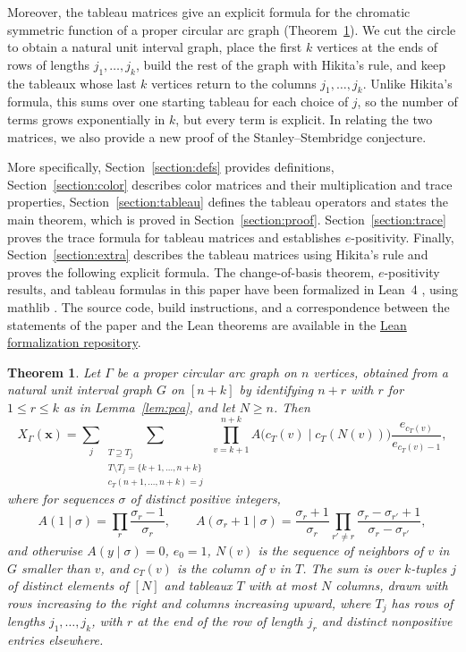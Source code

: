 \documentclass[12pt]{article}
\theoremstyle{plain}
\newtheorem{theorem}{Theorem}
\theoremstyle{definition}
\theoremstyle{remark}
\begin{document}
Moreover, the tableau matrices give an explicit formula for the chromatic symmetric function of a proper circular arc graph (Theorem~\ref{thm:pca-formula}). We cut the circle to obtain a natural unit interval graph, place the first $k$ vertices at the ends of rows of lengths $j_1,\dots,j_k$, build the rest of the graph with Hikita's rule, and keep the tableaux whose last $k$ vertices return to the columns $j_1,\dots,j_k$. Unlike Hikita's formula, this sums over one starting tableau for each choice of $j$, so the number of terms grows exponentially in $k$, but every term is explicit. In relating the two matrices, we also provide a new proof
of the Stanley--Stembridge conjecture.

More specifically, Section~\ref{section:defs} provides definitions, Section~\ref{section:color} describes color matrices and their multiplication and trace properties, Section~\ref{section:tableau}
defines the tableau operators and states the main theorem, which is proved in Section~\ref{section:proof}. Section~\ref{section:trace} proves
the trace formula for tableau matrices and establishes $e$-positivity. Finally, Section~\ref{section:extra} describes the tableau matrices using Hikita's rule and proves the following explicit formula. The change-of-basis theorem, $e$-positivity results, and tableau formulas in this paper have been formalized in Lean~4 \cite{lean4}, using mathlib \cite{mathlib}. The source code, build instructions, and a correspondence between the statements of the paper and the Lean theorems are available in the \href{https://github.com/goombamaui/ProperCircularArcGraphs}{Lean formalization repository}.

\begin{theorem}\label{thm:pca-formula}
Let $\Gamma$ be a proper circular arc graph on $n$ vertices, obtained from
a natural unit interval graph $G$ on $[n+k]$ by identifying $n+r$ with $r$
for $1\le r\le k$ as in Lemma~\ref{lem:pca}, and let $N\ge n$. Then
\[
X_\Gamma(\bm x)=\sum_j\sum_{\substack{T\supseteq T_j\\
 T\setminus T_j=\{k+1,\dots,n+k\}\\ c_T(n+1,\dots,n+k)=j}}\
 \prod_{v=k+1}^{n+k}
 A\bigl(c_T(v)\mid c_T(N(v))\bigr)\frac{e_{c_T(v)}}{e_{c_T(v)-1}},
\]
where for sequences $\sigma$ of distinct positive integers,
\[
A(1\mid\sigma)=\prod_r\frac{\sigma_r-1}{\sigma_r},\qquad
A(\sigma_r+1\mid\sigma)=\frac{\sigma_r+1}{\sigma_r}\prod_{r'\ne r}\frac{\sigma_r-\sigma_{r'}+1}{\sigma_r-\sigma_{r'}},
\]
and otherwise $A(y\mid\sigma)=0$, $e_0=1$, $N(v)$ is the sequence of
neighbors of $v$ in $G$ smaller than $v$, and $c_T(v)$ is the column of
$v$ in $T$. The sum is over $k$-tuples $j$ of distinct elements of $[N]$
and tableaux $T$ with at most $N$ columns, drawn with rows increasing to
the right and columns increasing upward, where $T_j$ has rows of lengths
$j_1,\dots,j_k$, with $r$ at the end of the row of length $j_r$ and
distinct nonpositive entries elsewhere.
\end{theorem}
\end{document}
